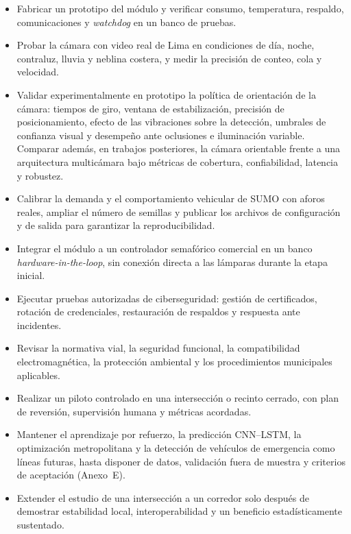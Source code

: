 \begin{itemize}
\item Fabricar un prototipo del módulo y verificar consumo, temperatura, respaldo, comunicaciones y
\textit{watchdog} en un banco de pruebas.
\item Probar la cámara con video real de Lima en condiciones de día, noche, contraluz, lluvia y neblina
costera, y medir la precisión de conteo, cola y velocidad.
\item Validar experimentalmente en prototipo la política de orientación de la cámara: tiempos de giro,
ventana de estabilización, precisión de posicionamiento, efecto de las vibraciones sobre la detección,
umbrales de confianza visual y desempeño ante oclusiones e iluminación variable. Comparar además, en
trabajos posteriores, la cámara orientable frente a una arquitectura multicámara bajo métricas de
cobertura, confiabilidad, latencia y robustez.
\item Calibrar la demanda y el comportamiento vehicular de SUMO con aforos reales, ampliar el número de
semillas y publicar los archivos de configuración y de salida para garantizar la reproducibilidad.
\item Integrar el módulo a un controlador semafórico comercial en un banco \textit{hardware-in-the-loop},
sin conexión directa a las lámparas durante la etapa inicial.
\item Ejecutar pruebas autorizadas de ciberseguridad: gestión de certificados, rotación de credenciales,
restauración de respaldos y respuesta ante incidentes.
\item Revisar la normativa vial, la seguridad funcional, la compatibilidad electromagnética, la protección
ambiental y los procedimientos municipales aplicables.
\item Realizar un piloto controlado en una intersección o recinto cerrado, con plan de reversión,
supervisión humana y métricas acordadas.
\item Mantener el aprendizaje por refuerzo, la predicción CNN--LSTM, la optimización metropolitana y la
detección de vehículos de emergencia como líneas futuras, hasta disponer de datos, validación fuera de
muestra y criterios de aceptación (Anexo~E).
\item Extender el estudio de una intersección a un corredor solo después de demostrar estabilidad local,
interoperabilidad y un beneficio estadísticamente sustentado.
\end{itemize}

